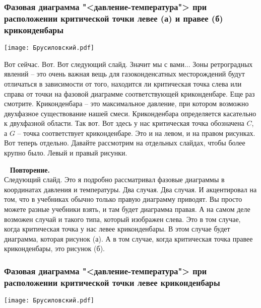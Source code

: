 \documentclass[main.tex]{subfiles}
\begin{document}
\subsubsection{Фазовая диаграмма "<давление-температура"> при расположении критической точки левее (а) и правее (б) криконденбары}

\begin{center}
\texttt{[image: Брусиловский.pdf]}
\end{center}

Вот сейчас.
Вот.
Вот следующий слайд.
Значит мы с вами...
Зоны ретроградных явлений -- это очень важная вещь для газоконденсатных месторождений будут отличаться в зависимости от того, находится ли критическая точка слева или справа от точки на фазовой диаграмме соответствующей криконденбаре.
Еще раз смотрите.
Криконденбара -- это максимальное давление, при котором возможно двухфазное существование нашей смеси.
Криконденбара определяется касательно к двухфазной области.
Так вот.
Вот здесь у нас критическая точка обозначена $C$, а $G$ -- точка соответствует криконденбаре.
Это и на левом, и на правом рисунках.
Вот теперь отдельно.
Давайте рассмотрим на отдельных слайдах, чтобы более крупно
было.
Левый и правый рисунки.

\ \newline
\textbf{Повторение.}\\
Следующий слайд.
Это я подробно рассматривал фазовые диаграммы в координатах давления и температуры.
Два случая. Два случая. И акцентировал на том, что в учебниках обычно только правую диаграмму приводят.
Вы просто можете разные учебники взять, и там будет диаграмма правая.
А на самом деле возможен случай и такого типа, который изображен слева.
Это в том случае, когда критическая точка у нас левее криконденбары.
В этом случае будет диаграмма, которая рисунок (а).
А в том случае, когда критическая точка правее криконденбары, это рисунок (б).

\subsubsection{Фазовая диаграмма "<давление-температура"> при расположении критической точки левее криконденбары}

\begin{center}
\texttt{[image: Брусиловский.pdf]}
\end{center}
\end{document}
